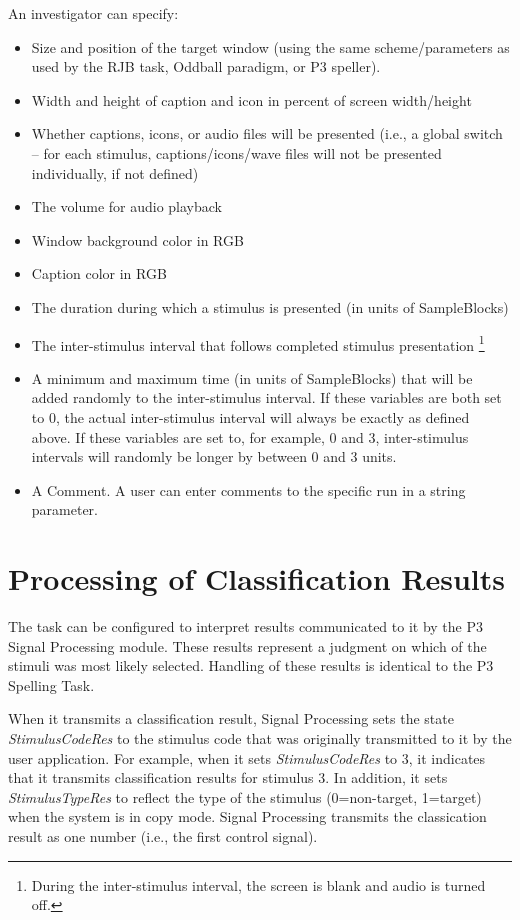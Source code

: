 \documentclass[letterpaper,oneside,12pt]{article}
\begin{document}
An investigator can specify:
\begin{itemize}
 \item Size and position of the target window (using the same scheme/parameters 
       as used by the RJB task, Oddball paradigm, or P3 speller).
 \item Width and height of caption and icon in percent of screen width/height
 \item Whether captions, icons, or audio files will be presented
       (i.e., a global switch -- for each stimulus, captions/icons/wave files
       will not be presented individually, if not defined)
 \item The volume for audio playback
 \item Window background color in RGB
 \item Caption color in RGB
 \item The duration during which a stimulus is presented (in units of SampleBlocks)
 \item The inter-stimulus interval that follows completed stimulus presentation \footnote{During 
       the inter-stimulus interval, the screen is blank and audio is turned off.}
 \item A minimum and maximum time (in units of SampleBlocks) that will be added randomly
       to the inter-stimulus interval. If these variables are both set to 0,
       the actual inter-stimulus interval will always be exactly as defined above.
       If these variables are set to, for example, 0 and 3, inter-stimulus intervals
       will randomly be longer by between 0 and 3 units.
 \item A Comment. A user can enter comments to the specific run in a string parameter.
\end{itemize}


\section{Processing of Classification Results}

The task can be configured to interpret results communicated to it by the P3 
Signal Processing module. These results represent a judgment on which of the 
stimuli was most likely selected. Handling of these results is identical to the 
P3 Spelling Task. 

When it transmits a classification result, Signal Processing sets the state 
\emph{StimulusCodeRes} to the stimulus code that was originally transmitted to 
it by the user application. For example, when it sets \emph{StimulusCodeRes} to 
3, it indicates that it transmits classification results for stimulus 3. In 
addition, it sets \emph{StimulusTypeRes} to reflect the type of the stimulus 
(0=non-target, 1=target) when the system is in copy mode. Signal Processing 
transmits the classication result as one number (i.e., the first control signal).
\end{document}
